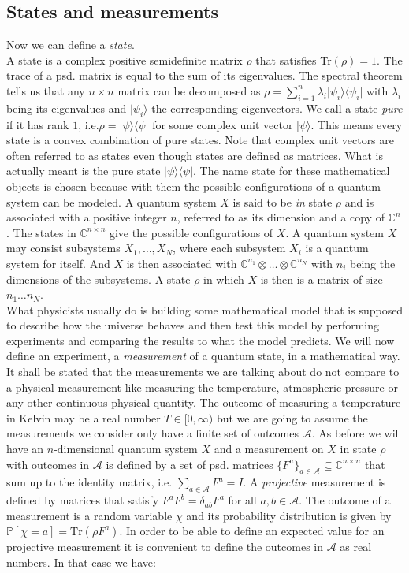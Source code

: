 \subsection{States and measurements}
Now we can define a \emph{state}.\\
A state is a complex positive semidefinite matrix $\rho$ that satisfies Tr$(\rho)=1$. The trace of a psd. matrix is equal to the sum of its eigenvalues. The spectral theorem tells us that any $n \times n $ matrix can be decomposed as $\rho = \sum_{i=1}^n \lambda_i \vert \psi_i \rangle \langle \psi_i \vert$ with $\lambda_i$ being its eigenvalues and $\vert \psi_i \rangle$ the corresponding eigenvectors. We call a state \emph{pure} if it has rank $1$, i.e.$ \rho = \vert \psi \rangle \langle \psi \vert$ for some complex unit vector $\vert \psi \rangle$. This means every state is a convex combination of pure states. Note that complex unit vectors are often referred to as states even though states are defined as matrices. What is actually meant is the pure state $\vert \psi \rangle \langle \psi \vert$. The name state for these mathematical objects is chosen because with them the possible configurations of a quantum system can be modeled. A quantum system $X$ is said to be \textit{in} state $\rho$ and is associated with a positive integer $n$, referred to as its dimension and a copy of $\mathbb{C}^n$. The states in $\mathbb{C}^{n \times n}$ give the possible configurations of $X$. A quantum system $X$ may consist subsystems $X_1, \dots , X_N$, where each subsystem $X_i$ is a quantum system for itself. And $X$ is then associated with $\mathbb{C}^{n_1}\otimes \dots \otimes \mathbb{C}^{n_N}$ with $n_i$ being the dimensions of the subsystems. A state $\rho$ in which $X$ is then is a matrix of size $n_1\dots n_N$. \\
What physicists usually do is building some mathematical model that is supposed to describe how the universe behaves and then test this model by performing experiments and comparing the results to what the model predicts. We will now define an experiment, a \emph{measurement} of a quantum state, in a mathematical way. It shall be stated that the measurements we are talking about do not compare to a physical measurement like measuring the temperature, atmospheric pressure or any other continuous physical quantity. The outcome of measuring a temperature in Kelvin may be a real number $T \in [0 , \infty)$ but we are going to assume the measurements we consider only have a finite set of outcomes $\mathcal{A}$. As before we will have an $n$-dimensional quantum system $X$ and a measurement on $X$ in state $\rho$ with outcomes in $\mathcal{A}$ is defined by a set of psd. matrices $\{ F^a \}_{a \in \mathcal{A}} \subseteq \mathbb{C}^{n \times n}$ that sum up to the identity matrix, i.e. $\sum_{a \in \mathcal{A}} F^a = I$. A \emph{projective} measurement is defined by matrices that satisfy $F^aF^b = \delta_{ab}F^a$ for all $a,b \in \mathcal{A}$. The outcome of a measurement is a random variable $\chi$ and its probability distribution is given by $\mathbb{P} \left[ \chi = a \right] = \text{Tr}(\rho F^a)$. In order to be able to define an expected value for an projective measurement it is convenient to define the outcomes in $\mathcal{A}$ as real numbers. In that case we have: 
